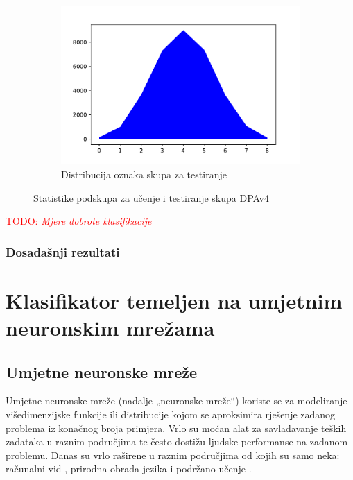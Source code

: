 \documentclass[times, utf8, numeric, diplomski]{fer}
\def\TODO#1{\noindent\textcolor{red}{TODO: \textit{#1}}\newline}
\def\todo#1{\TODO{#1}}
\begin{document}
\begin{figure}[H]
\begin{subfigure}{.5\textwidth}
\includegraphics[width=\textwidth]{nl9_ts_outputs.pdf}
\centering
\caption{Distribucija oznaka skupa za testiranje}
\label{fig:dpa4_test_outputs}
\end{subfigure}
\caption{Statistike podskupa za učenje i testiranje skupa DPAv4}
\end{figure}

\todo{Mjere dobrote klasifikacije}

\subsection{Dosadašnji rezultati}


\chapter{Klasifikator temeljen na umjetnim neuronskim mrežama}

\section{Umjetne neuronske mreže}
Umjetne neuronske mreže (nadalje „neuronske mreže“) koriste se za modeliranje višedimenzijske funkcije ili distribucije kojom se aproksimira rješenje zadanog problema iz konačnog broja primjera. Vrlo su moćan alat za savladavanje teških zadataka u raznim područjima te često dostižu ljudske performanse na zadanom problemu. Danas su vrlo raširene u raznim područjima od kojih su samo neka: računalni vid \citep{alexnet,yolo}, prirodna obrada jezika \citep{word2vec,char_cnn} i podržano učenje \citep{atari,active_learn}.
\end{document}

